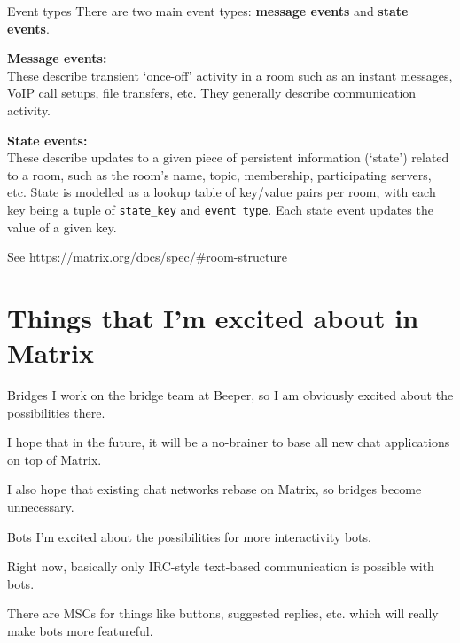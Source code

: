 \documentclass{acm}
\begin{document}
\begin{frame}{Event types}
    There are two main event types: \textbf{message events} and \textbf{state
    events}.
    \pause

    \textbf{Message events:} \\
    These describe transient `once-off' activity in a room such as an instant
    messages, VoIP call setups, file transfers, etc. They generally describe
    communication activity.
    \pause

    \textbf{State events:} \\
    These describe updates to a given piece of persistent information (`state')
    related to a room, such as the room's name, topic, membership, participating
    servers, etc. State is modelled as a lookup table of key/value pairs per
    room, with each key being a tuple of \texttt{state\_key} and \texttt{event
    type}. Each state event updates the value of a given key.

    {
        \tiny
        See \url{https://matrix.org/docs/spec/\#room-structure}
    }
\end{frame}

\section{Things that I'm excited about in Matrix}

\begin{frame}{Bridges}
    I work on the bridge team at Beeper, so I am obviously excited about the
    possibilities there.
    \pause

    I hope that in the future, it will be a no-brainer to base all new chat
    applications on top of Matrix.

    I also hope that existing chat networks rebase on Matrix, so bridges become
    unnecessary.
\end{frame}

\begin{frame}{Bots}
    I'm excited about the possibilities for more interactivity bots.
    \pause

    Right now, basically only IRC-style text-based communication is possible
    with bots.

    There are MSCs for things like buttons, suggested replies, etc. which will
    really make bots more featureful.
\end{frame}
\end{document}
